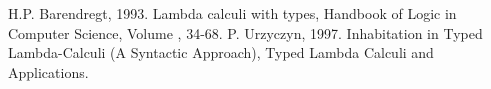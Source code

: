 \begin{thebibliography}{9}
H.P. Barendregt, 1993. Lambda calculi with types, Handbook of Logic in Computer Science, Volume , 34-68.
P. Urzyczyn, 1997. Inhabitation in Typed Lambda-Calculi (A Syntactic Approach), Typed Lambda Calculi and Applications.
\end{thebibliography}